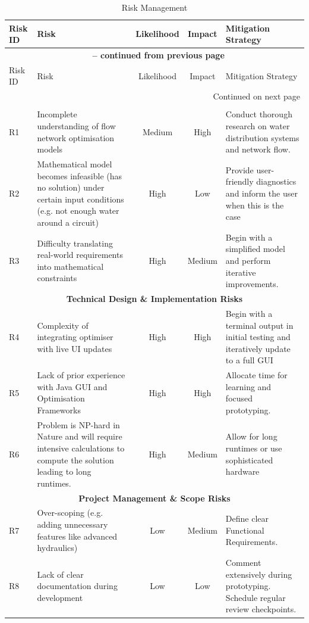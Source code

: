 \begin{longtable}{l p{4.5cm} c c p{4.5cm}}
\caption{Risk Management} \label{table:riskmanagementtable} \\
\toprule
Risk ID & Risk & Likelihood & Impact & Mitigation Strategy\\
\midrule
\endfirsthead

\multicolumn{5}{c}{{\bfseries \tablename\ \thetable{} -- continued from previous page}} \\
\toprule
Risk ID & Risk & Likelihood & Impact & Mitigation Strategy\\
\midrule
\endhead

\midrule \multicolumn{5}{r}{{Continued on next page}} \\
\endfoot

\bottomrule
\endlastfoot

\multicolumn{5}{c}{\textbf{Research \& Mathematical Modelling Risks}} \\
R1 & Incomplete understanding of flow network optimisation models & Medium & High & Conduct thorough research on water distribution systems and network flow.\\
R2 & Mathematical model becomes infeasible (has no solution) under certain input conditions (e.g. not enough water around a circuit) & High & Low & Provide user-friendly diagnostics and inform the user when this is the case\\
R3 & Difficulty translating real-world requirements into mathematical constraints & High & Medium & Begin with a simplified model and perform iterative improvements.\\
\midrule

\multicolumn{5}{c}{\textbf{Technical Design \& Implementation Risks}} \\
R4 & Complexity of integrating optimiser with live UI updates & High & High & Begin with a terminal output in initial testing and iteratively update to a full GUI\\
R5 & Lack of prior experience with Java GUI and Optimisation Frameworks & High & High & Allocate time for learning and focused prototyping.\\
R6 & Problem is NP-hard in Nature and will require intensive calculations to compute the solution leading to long runtimes. & High & Medium & Allow for long runtimes or use sophisticated hardware\\ 
\midrule

\multicolumn{5}{c}{\textbf{Project Management \& Scope Risks}} \\
R7 & Over-scoping (e.g. adding unnecessary features like advanced hydraulics) & Low & Medium & Define clear Functional Requirements.\\
R8 & Lack of clear documentation during development & Low & Low & Comment extensively during prototyping. Schedule regular review checkpoints.\\
\midrule


\end{longtable}
